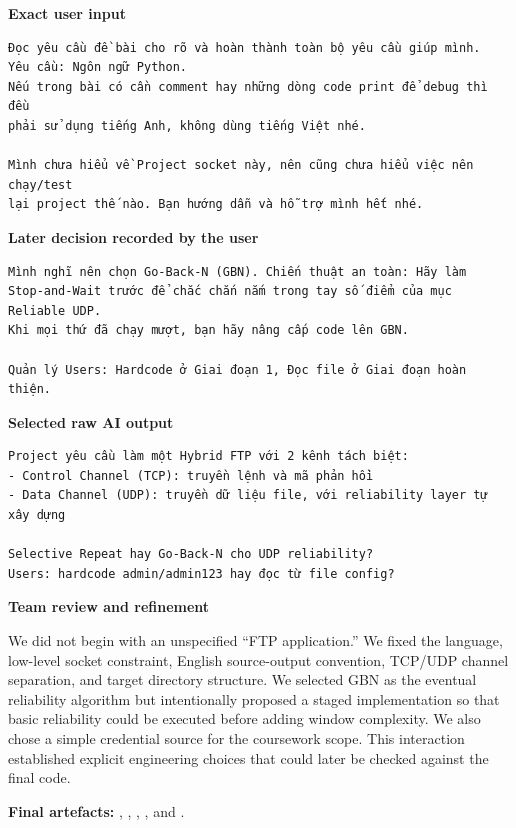 \sourceA

\textbf{Exact user input}

\begin{lstlisting}
Đọc yêu cầu đề bài cho rõ và hoàn thành toàn bộ yêu cầu giúp mình.
Yêu cầu: Ngôn ngữ Python.
Nếu trong bài có cần comment hay những dòng code print để debug thì đều
phải sử dụng tiếng Anh, không dùng tiếng Việt nhé.

Mình chưa hiểu về Project socket này, nên cũng chưa hiểu việc nên chạy/test
lại project thế nào. Bạn hướng dẫn và hỗ trợ mình hết nhé.
\end{lstlisting}

\textbf{Later decision recorded by the user}

\begin{lstlisting}
Mình nghĩ nên chọn Go-Back-N (GBN). Chiến thuật an toàn: Hãy làm
Stop-and-Wait trước để chắc chắn nắm trong tay số điểm của mục Reliable UDP.
Khi mọi thứ đã chạy mượt, bạn hãy nâng cấp code lên GBN.

Quản lý Users: Hardcode ở Giai đoạn 1, Đọc file ở Giai đoạn hoàn thiện.
\end{lstlisting}

\textbf{Selected raw AI output}

\begin{lstlisting}
Project yêu cầu làm một Hybrid FTP với 2 kênh tách biệt:
- Control Channel (TCP): truyền lệnh và mã phản hồi
- Data Channel (UDP): truyền dữ liệu file, với reliability layer tự xây dựng

Selective Repeat hay Go-Back-N cho UDP reliability?
Users: hardcode admin/admin123 hay đọc từ file config?
\end{lstlisting}

\textbf{Team review and refinement}

We did not begin with an unspecified ``FTP application.'' We fixed the
language, low-level socket constraint, English source-output convention,
TCP/UDP channel separation, and target directory structure. We selected GBN
as the eventual reliability algorithm but intentionally proposed a staged
implementation so that basic reliability could be executed before adding
window complexity. We also chose a simple credential source for the
coursework scope. This interaction established explicit engineering choices
that could later be checked against the final code.

\textbf{Final artefacts:} , , ,
, and .

